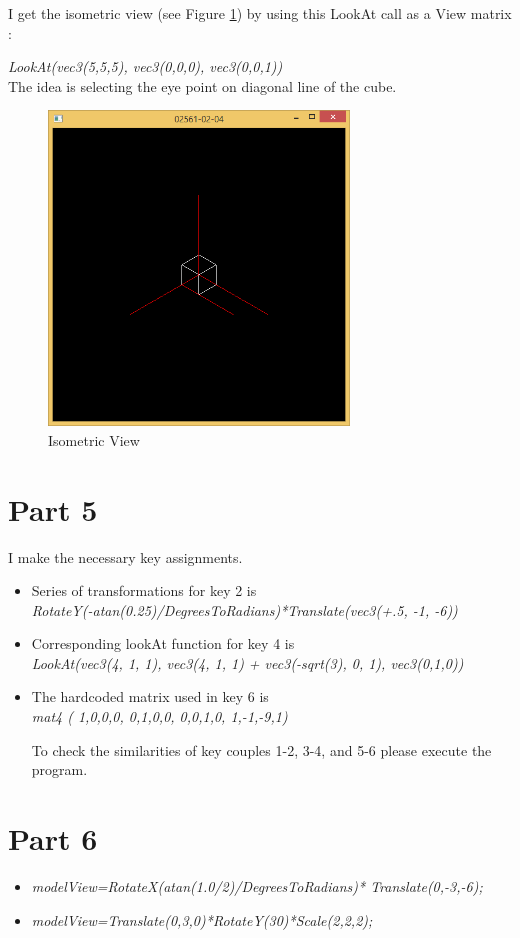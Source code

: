 I get the isometric view (see Figure \ref{fig:2-4}) by using this LookAt call as a View matrix :

\emph{LookAt(vec3(5,5,5), vec3(0,0,0), vec3(0,0,1))} \\
The idea is selecting the eye point on diagonal line of the cube. 

\begin{figure}[hp]
\centering
\includegraphics[width=8cm]{../Screenshots/ex-2/4.png}
\caption{Isometric View}
\label{fig:2-4}
\end{figure}


\section{Part 5}
\label{sec:del-5}

I make the necessary key assignments. 
\begin{itemize}
  \item Series of transformations for key 2 is \\
      \emph{RotateY(-atan(0.25)/DegreesToRadians)*Translate(vec3(+.5, -1, -6))}
  \item Corresponding lookAt function for key 4 is\\
      \emph{LookAt(vec3(4, 1, 1), vec3(4, 1, 1) + vec3(-sqrt(3), 0, 1), vec3(0,1,0))}
  \item The hardcoded matrix used in key 6 is\\
      \emph{mat4 ( 1,0,0,0,
				  0,1,0,0,
				  0,0,1,0,
				  1,-1,-9,1)}

To check the similarities of key couples 1-2, 3-4, and 5-6 please execute the program.
\end{itemize}

\section{Part 6}
\label{sec:del-6}

\begin{itemize}
  \item \emph{modelView=RotateX(atan(1.0/2)/DegreesToRadians)*
		Translate(0,-3,-6);}
  \item \emph{modelView=Translate(0,3,0)*RotateY(30)*Scale(2,2,2);}
\end{itemize}

